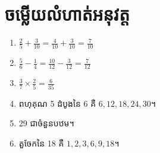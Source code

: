 \section{ចម្លើយលំហាត់អនុវត្ត}
\begin{enumerate}[label=\arabic*.]
    \item $\frac{2}{5} + \frac{3}{10} = \frac{4}{10} + \frac{3}{10} = \frac{7}{10}$
    \item $\frac{5}{6} - \frac{1}{4} = \frac{10}{12} - \frac{3}{12} = \frac{7}{12}$
    \item $\frac{3}{7} \times \frac{2}{5} = \frac{6}{35}$
    \item ពហុគុណ 5 ដំបូងនៃ 6 គឺ $6, 12, 18, 24, 30$។
    \item 29 ជាចំនួនបឋម។
    \item តួចែកនៃ 18 គឺ $1, 2, 3, 6, 9, 18$។
\end{enumerate}
